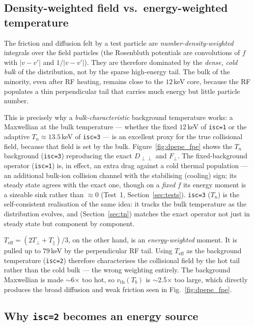 \documentclass[11pt,a4paper]{article}
\begin{document}
\subsection{Density-weighted field vs.\ energy-weighted temperature}

The friction and diffusion felt by a test particle are
\emph{number-density-weighted} integrals over the field particles (the
Rosenbluth potentials are convolutions of $f$ with $|v-v'|$ and $1/|v-v'|$).
They are therefore dominated by the \emph{dense, cold bulk} of the
distribution, not by the sparse high-energy tail. The bulk of the minority,
even after RF heating, remains close to the $12$\,keV core, because the RF
populates a thin perpendicular tail that carries much energy but little
particle number.

This is precisely why a \emph{bulk-characteristic} background temperature
works: a Maxwellian at the bulk temperature --- whether the fixed $12$\,keV of
\texttt{isc=1} or the adaptive $T_n\approx13.5$\,keV of \texttt{isc=3} --- is an
excellent proxy for the true collisional field, because that field is set by
the bulk. Figure~\ref{fig:dpepe_fpe} shows the $T_n$ background (\texttt{isc=3})
reproducing the exact $D_{\perp\perp}$ and $F_\perp$. The fixed-background
operator (\texttt{isc=1}) is, in effect, an extra drag against a cold thermal
population --- an additional bulk-ion collision channel with the stabilising
(cooling) sign; its steady state agrees with the exact one, though on a
\emph{fixed} $f$ its energy moment is a sizeable sink rather than $\approx0$
(Test~1, Section~\ref{sec:tests}). \texttt{isc=3} ($T_n$) is the
self-consistent realisation of the same idea: it tracks the bulk temperature
as the distribution evolves, and (Section~\ref{sec:tn}) matches the exact
operator not just in steady state but component by component.

$T_\text{eff} = (2T_\perp + T_\parallel)/3$, on the other hand, is an
\emph{energy-weighted} moment. It is pulled up to $79$\,keV by the
perpendicular RF tail. Using $T_\text{eff}$ as the background temperature
(\texttt{isc=2}) therefore characterises the collisional field by the hot
tail rather than the cold bulk --- the wrong weighting entirely. The
background Maxwellian is made $\sim$6$\times$ too hot, so
$v_\text{th}(T_b)$ is $\sim$2.5$\times$ too large, which directly produces the
broad diffusion and weak friction seen in Fig.~\ref{fig:dpepe_fpe}.

\subsection{Why \texttt{isc=2} becomes an energy source}
\end{document}
